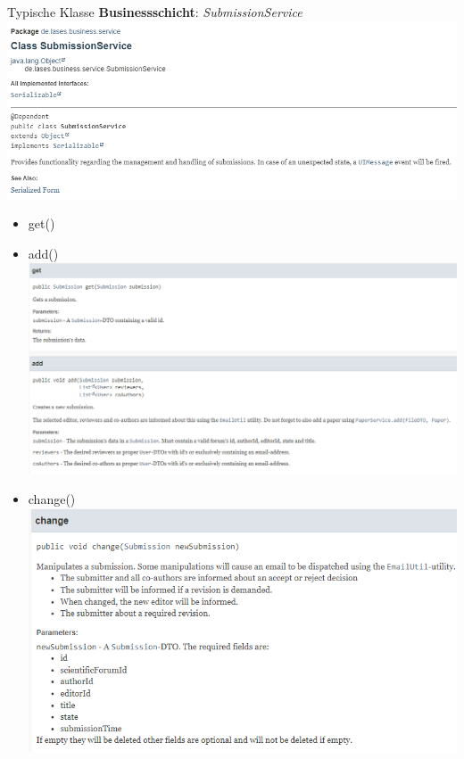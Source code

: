 \documentclass{beamer}
\begin{document}
    \begin{frame}{Typische Klasse \textbf{Businessschicht}:}
        \emph{SubmissionService}
        \centering
        \includegraphics[height=1.1\textheight]{graphics/service/doc_service}
        \pause
        \begin{itemize}
            \item get()
            \item add()
            \centering
            \includegraphics[height=1.1\textheight]{graphics/service/doc_get_add}
            \item change()
            \centering
            \includegraphics[height=1.1\textheight]{graphics/service/doc_change}


\end{itemize}
\end{frame}
\end{document}
